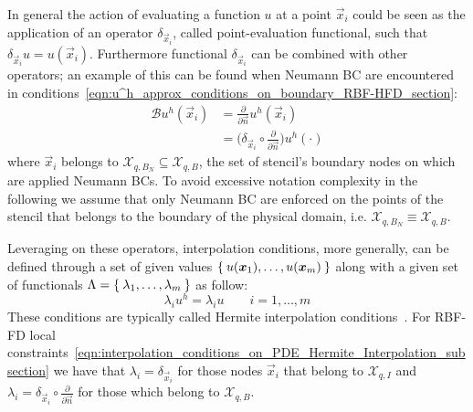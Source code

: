 In general the action of evaluating a function $u$ at a point $\vec{x}_i$ could be seen as the application of an operator $\delta_{\vec{x}_i}$, called point-evaluation functional, such that $\delta_{\vec{x}_i} u = u(\vec{x}_i)$. Furthermore functional $\delta_{\vec{x}_i}$ can be combined with other operators; an example of this can be found when Neumann BC are encountered in conditions~\eqref{eqn:u^h_approx_conditions_on_boundary_RBF-HFD_section}:
\begin{equation}
	\begin{aligned}
		\mathcal{B} u^h(\vec{x}_i) & = \frac{\partial}{\partial \vec{n}} u^h(\vec{x}_i)											\\
								   & = \bigg( \delta_{\vec{x}_i} \circ \frac{\partial}{\partial \vec{n}} \bigg) u^h(\cdot)
	\end{aligned}
\end{equation}
where $\vec{x}_i$ belongs to $\mathcal{X}_{q,B_N} \subseteq \mathcal{X}_{q,B}$, the set of stencil's boundary nodes on which are applied Neumann BCs. To avoid excessive notation complexity in the following we assume that only Neumann BC are enforced on the points of the stencil that belongs to the boundary of the physical domain, i.e. $\mathcal{X}_{q,B_N} \equiv \mathcal{X}_{q,B}$.

Leveraging on these operators, interpolation conditions, more generally, can be defined through a set of given values $\Set{u(\boldsymbol{x}_1), \dots, u(\boldsymbol{x}_{m})}$ along with a given set of functionals $\Lambda = \Set{\lambda_1, \dots, \lambda_{m}}$ as follow:
\begin{equation}
	\label{eqn:Hermite_interpolation_conditions}
	\lambda_i u^h = \lambda_i u \qquad i = 1, \dots, m
\end{equation}
These conditions are typically called Hermite interpolation conditions~\cite{Fasshauer:details_on_basic_functions}.
For RBF-FD local constraints~\eqref{eqn:interpolation_conditions_on_PDE_Hermite_Interpolation_subsection} we have that $\lambda_i = \delta_{\vec{x}_i}$ for those nodes $\vec{x}_i$ that belong to $\mathcal{X}_{q,I}$ and $\lambda_i = \delta_{\vec{x}_i} \circ \frac{\partial}{\partial \vec{n}}$ for those which belong to $\mathcal{X}_{q,B}$.

